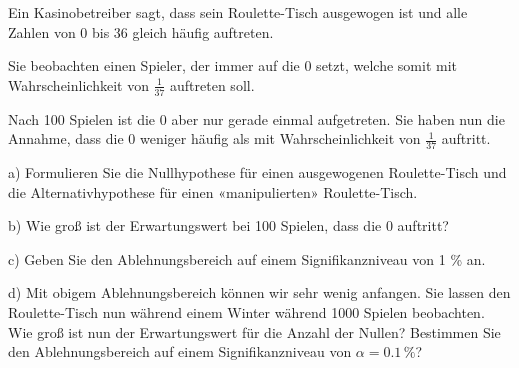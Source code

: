 Ein Kasinobetreiber sagt, dass sein Roulette-Tisch ausgewogen ist und
alle Zahlen von 0 bis 36 gleich häufig auftreten.

Sie beobachten einen Spieler, der immer auf die 0 setzt, welche somit
mit Wahrscheinlichkeit von $\frac1{37}$ auftreten soll.

Nach 100 Spielen ist die 0 aber nur gerade einmal aufgetreten. Sie
haben nun die Annahme, dass die 0 weniger häufig als mit
Wahrscheinlichkeit von $\frac1{37}$ auftritt.

a) Formulieren Sie die Nullhypothese für einen ausgewogenen Roulette-Tisch und
die Alternativhypothese für einen «manipulierten» Roulette-Tisch.

b) Wie groß ist der Erwartungswert bei 100 Spielen, dass die 0
auftritt?

c) Geben Sie den Ablehnungsbereich auf einem Signifikanzniveau von 1
\% an.

d) Mit obigem Ablehnungsbereich können wir sehr wenig anfangen. Sie
lassen den Roulette-Tisch nun während einem Winter während 1000
Spielen beobachten. Wie groß ist nun der Erwartungswert für die Anzahl
der Nullen? Bestimmen Sie den Ablehnungsbereich auf einem
Signifikanzniveau von $\alpha = 0.1\,\%$?


\newpage

